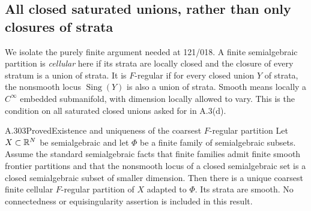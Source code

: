 \subsection{All closed saturated unions, rather than only closures of strata}

We isolate the purely finite argument needed at 121/018. A finite
semialgebraic partition is \emph{cellular} here if its strata are locally
closed and the closure of every stratum is a union of strata. It is
$F$-regular if for every closed union $Y$ of strata, the nonsmooth locus
$\operatorname{Sing}(Y)$ is also a union of strata. Smooth means locally
a $C^\infty$ embedded submanifold, with dimension locally allowed to vary.
This is the condition on all saturated closed unions asked for in A.3(d).

\begin{saresult}{A.303}{Proved}{Existence and uniqueness of the coarsest $F$-regular partition}
Let $X\subset\mathbb R^N$ be semialgebraic and let $\Phi$ be a finite family of
semialgebraic subsets. Assume the standard semialgebraic facts that finite
families admit finite smooth frontier partitions and that the nonsmooth
locus of a closed semialgebraic set is a closed semialgebraic subset of
smaller dimension. Then there is a unique coarsest finite cellular
$F$-regular partition of $X$ adapted to $\Phi$. Its strata are smooth.
No connectedness or equisingularity assertion is included in this result.
\end{saresult}
